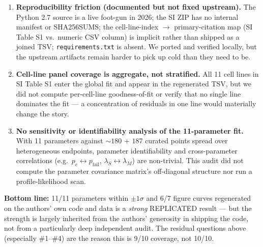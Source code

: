 \documentclass[11pt]{article}
\begin{document}
\begin{enumerate}
  \item \textbf{Reproducibility friction (documented but not fixed
        upstream).} The Python 2.7 source is a live foot-gun in 2026;
        the SI ZIP has no internal manifest or SHA256SUMS; the
        cell-line-index $\rightarrow$ primary-citation map (SI Table S1
        vs.\ numeric CSV column) is implicit rather than shipped as a
        joined TSV; \texttt{requirements.txt} is absent. We ported and
        verified locally, but the upstream artifacts remain harder to
        pick up cold than they need to be.

  \item \textbf{Cell-line panel coverage is aggregate, not
        stratified.} All 11 cell lines in SI Table S1 enter the global
        fit and appear in the regenerated TSV, but we did not compute
        per-cell-line goodness-of-fit or verify that no single line
        dominates the fit --- a concentration of residuals in one line
        would materially change the story.

  \item \textbf{No sensitivity or identifiability analysis of the
        11-parameter fit.} With 11 parameters against $\sim 180$ + $187$
        curated points spread over heterogeneous endpoints, parameter
        identifiability and cross-parameter correlations (e.g.\
        $p_c \leftrightarrow p_{\text{fail}}$, $\lambda_S \leftrightarrow
        \lambda_M$) are non-trivial. This audit did not compute the
        parameter covariance matrix's off-diagonal structure nor run a
        profile-likelihood scan.
\end{enumerate}

\textbf{Bottom line:} 11/11 parameters within $\pm 1\sigma$ and 6/7
figure curves regenerated on the authors' own code and data is a
\emph{strong} REPLICATED result --- but the strength is largely inherited
from the authors' generosity in shipping the code, not from a
particularly deep independent audit. The residual questions above
(especially \#1--\#4) are the reason this is 9/10 coverage, not 10/10.


\end{document}
